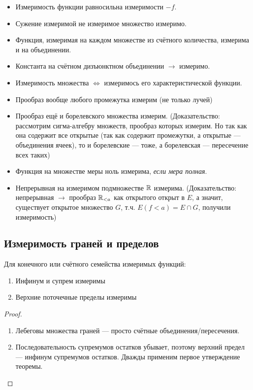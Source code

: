 \documentclass[12pt, a4paper, oneside]{memoir}
\begin{document}
\begin{itemize}
    \item Измеримость функции равносильна измеримости $-f$.
    \item Сужение измеримой не измеримое множество измеримо.
    \item Функция, измеримая на каждом множестве из счётного количества, измерима и на объединении.
    \item Константа на счётном дизъюнктном объединении $→$ измеримо.
    \item Измеримость множества $\Leftrightarrow$ измеримось его характеристической функции.
    \item Прообраз вообще любого промежутка измерим (не только лучей)
    \item Прообраз ещё и борелевского множества измерим.
    (Доказательство: рассмотрим сигма-алгебру множеств, прообраз которых измерим. Но так как она содержит все открытые
    (так как содержит промежутки, а открытые — объединения ячеек), то и борелевские — тоже, а борелевская — пересечение всех таких)
    \item Функция на множестве меры ноль измерима, \textit{если мера полная}.
    \item Непрерывная на измеримом подмножестве ${\mathbb{R}}$ измерима.
    (Доказательство: непрерывная $→$ прообраз ${\mathbb{R}}_{< a}$ как открытого открыт в $E$, 
    а значит, существует открытое множество $G$, т.ч. $E(f < a) = E \cap G$, получили измеримость)
\end{itemize}


\subsection{Измеримость граней и пределов}

\begin{theorem}

    Для конечного или счётного семейства измеримых функций:
    
    \begin{enumerate}
        \item Инфинум и супрем измеримы
        \item Верхние поточечные пределы измеримы
    \end{enumerate}

    \begin{proof}
        \begin{enumerate}
            \item Лебеговы множества граней — просто счётные объединения/пересечения.
            \item Последовательность супремумов остатков убывает, поэтому верхний предел — инфинум супремумов остатков.
            Дважды применим первое утверждение теоремы.
        \end{enumerate}
    \end{proof}
\end{theorem}
\end{document}
